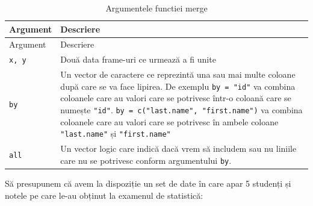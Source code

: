 \documentclass[]{article}
\begin{document}
\begin{longtable}[]{@{}ll@{}}
\caption{Argumentele functiei merge}\tabularnewline
\toprule
\begin{minipage}[b]{0.19\columnwidth}\raggedright
Argument\strut
\end{minipage} & \begin{minipage}[b]{0.75\columnwidth}\raggedright
Descriere\strut
\end{minipage}\tabularnewline
\midrule
\endfirsthead
\toprule
\begin{minipage}[b]{0.19\columnwidth}\raggedright
Argument\strut
\end{minipage} & \begin{minipage}[b]{0.75\columnwidth}\raggedright
Descriere\strut
\end{minipage}\tabularnewline
\midrule
\endhead
\begin{minipage}[t]{0.19\columnwidth}\raggedright
\texttt{x,\ y}\strut
\end{minipage} & \begin{minipage}[t]{0.75\columnwidth}\raggedright
Două data frame-uri ce urmează a fi unite\strut
\end{minipage}\tabularnewline
\begin{minipage}[t]{0.19\columnwidth}\raggedright
\texttt{by}\strut
\end{minipage} & \begin{minipage}[t]{0.75\columnwidth}\raggedright
Un vector de caractere ce reprezintă una sau mai multe coloane după care
se va face lipirea. De exemplu \texttt{by\ =\ "id"} va combina coloanele
care au valori care se potrivesc într-o coloană care se numește
\texttt{"id"}. \texttt{by\ =\ c("last.name",\ "first.name")} va combina
coloanele care au valori care se potrivesc în ambele coloane
\texttt{"last.name"} și \texttt{"first.name"}\strut
\end{minipage}\tabularnewline
\begin{minipage}[t]{0.19\columnwidth}\raggedright
\texttt{all}\strut
\end{minipage} & \begin{minipage}[t]{0.75\columnwidth}\raggedright
Un vector logic care indică dacă vrem să includem sau nu liniile care nu
se potrivesc conform argumentului \texttt{by}.\strut
\end{minipage}\tabularnewline
\bottomrule
\end{longtable}

Să presupunem că avem la dispoziție un set de date în care apar 5
studenți și notele pe care le-au obținut la examenul de statistică:
\end{document}
